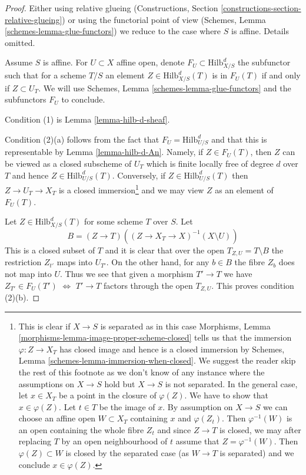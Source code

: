 \documentclass[10pt,a4paper]{amsart}
\theoremstyle{plain}
\theoremstyle{definition}
\theoremstyle{remark}
\numberwithin{equation}{subsection}
\def\Hilbfunctor{\mathrm{Hilb}}
\begin{document}
\begin{proof}
Either using relative glueing (Constructions, Section
\ref{constructions-section-relative-glueing}) or using
the functorial point of view
(Schemes, Lemma \ref{schemes-lemma-glue-functors})
we reduce to the case where $S$ is affine. Details omitted.

\medskip\noindent
Assume $S$ is affine. For $U \subset X$ affine open, denote
$F_U \subset \Hilbfunctor^d_{X/S}$ the subfunctor such that
for a scheme $T/S$ an element $Z \in \Hilbfunctor^d_{X/S}(T)$
is in $F_U(T)$ if and only if $Z \subset U_T$. We will use
Schemes, Lemma \ref{schemes-lemma-glue-functors}
and the subfunctors $F_U$ to conclude.

\medskip\noindent
Condition (1) is Lemma \ref{lemma-hilb-d-sheaf}.

\medskip\noindent
Condition (2)(a) follows from the fact that $F_U = \Hilbfunctor^d_{U/S}$
and that this is representable by Lemma \ref{lemma-hilb-d-An}.
Namely, if $Z \in F_U(T)$, then $Z$ can be viewed as a closed subscheme
of $U_T$ which is finite locally free of degree $d$ over $T$ and hence
$Z \in \Hilbfunctor^d_{U/S}(T)$. Conversely, if $Z \in \Hilbfunctor^d_{U/S}(T)$
then $Z \to U_T \to X_T$ is a closed immersion\footnote{This is clear
if $X \to S$ is separated as in this case Morphisms, Lemma
\ref{morphisms-lemma-image-proper-scheme-closed}
tells us that the immersion $\varphi : Z \to X_T$ has closed image
and hence is a closed immersion by
Schemes, Lemma \ref{schemes-lemma-immersion-when-closed}. We suggest the
reader skip the rest of this footnote as we don't know of any instance
where the assumptions on $X \to S$ hold but $X \to S$ is not separated.
In the general case, let $x \in X_T$ be a point in the closure of
$\varphi(Z)$. We have to show that $x \in \varphi(Z)$. Let $t \in T$ be the
image of $x$. By assumption on $X \to S$ we can choose an affine open
$W \subset X_T$ containing $x$ and $\varphi(Z_t)$. Then $\varphi^{-1}(W)$
is an open containing the whole fibre $Z_t$ and since $Z \to T$ is closed,
we may after replacing $T$ by an open neighbourhood of $t$ assume that
$Z = \varphi^{-1}(W)$. Then $\varphi(Z) \subset W$ is closed by the
separated case (as $W \to T$ is separated) and we conclude $x \in \varphi(Z)$.}
and we may view $Z$ as an element of $F_U(T)$.

\medskip\noindent
Let $Z \in \Hilbfunctor^d_{X/S}(T)$ for some scheme $T$ over $S$. Let
$$
B = (Z \to T)\left((Z \to X_T \to X)^{-1}(X \setminus U)\right)
$$
This is a closed subset of $T$ and it is clear that over the open
$T_{Z, U} = T \setminus B$ the restriction $Z_{t'}$ maps into $U_{T'}$.
On the other hand, for any $b \in B$ the fibre $Z_b$ does not map
into $U$. Thus we see that given a morphism $T' \to T$ we
have $Z_{T'} \in F_U(T')$ $\Leftrightarrow$ $T' \to T$ factors through
the open $T_{Z, U}$. This proves condition (2)(b).


\end{proof}
\end{document}
